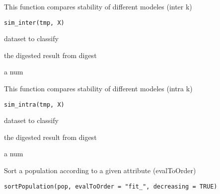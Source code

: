 \documentclass[a4paper]{book}
\begin{document}
%
\begin{Description}
This function compares stability of different modeles (inter k)
\end{Description}
%
\begin{Usage}
\begin{verbatim}
sim_inter(tmp, X)
\end{verbatim}
\end{Usage}
%
\begin{Arguments}
\begin{ldescription}
\item[\code{X:}] dataset to classify

\item[\code{tmp:}] the digested result from digest
\end{ldescription}
\end{Arguments}
%
\begin{Value}
a num
\end{Value}
%
\begin{Description}
This function compares stability of different modeles (intra k)
\end{Description}
%
\begin{Usage}
\begin{verbatim}
sim_intra(tmp, X)
\end{verbatim}
\end{Usage}
%
\begin{Arguments}
\begin{ldescription}
\item[\code{X:}] dataset to classify

\item[\code{tmp:}] the digested result from digest
\end{ldescription}
\end{Arguments}
%
\begin{Value}
a num
\end{Value}
%
\begin{Description}
Sort a population according to a given attribute (evalToOrder)
\end{Description}
%
\begin{Usage}
\begin{verbatim}
sortPopulation(pop, evalToOrder = "fit_", decreasing = TRUE)
\end{verbatim}
\end{Usage}
\end{document}
